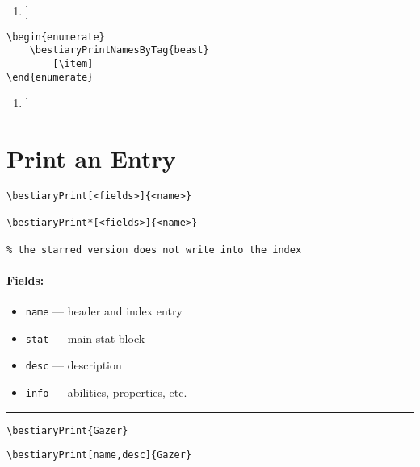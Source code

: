 \documentclass[itdr]{subfiles}
\begin{document}
\begin{enumerate}
	[\item]
\end{enumerate}

\vfill

\begin{lstlisting}
\begin{enumerate}
	\bestiaryPrintNamesByTag{beast}
		[\item]
\end{enumerate}
\end{lstlisting}

\begin{enumerate}
	[\item]
\end{enumerate}

\vfill
\break

\section{Print an Entry}

\begin{lstlisting}
\bestiaryPrint[<fields>]{<name>}

\bestiaryPrint*[<fields>]{<name>}

% the starred version does not write into the index
\end{lstlisting}

\paragraph{Fields:}
\begin{itemize}
	\item \lstinline!name! --- header and index entry
	\item \lstinline!stat! --- main stat block
	\item \lstinline!desc! --- description
	\item \lstinline!info! --- abilities, properties, etc.
\end{itemize}

\skipline
\hrule
\vfill

\begin{lstlisting}
\bestiaryPrint{Gazer}
\end{lstlisting}


\vfill

\begin{lstlisting}
\bestiaryPrint[name,desc]{Gazer}
\end{lstlisting}
\end{document}
